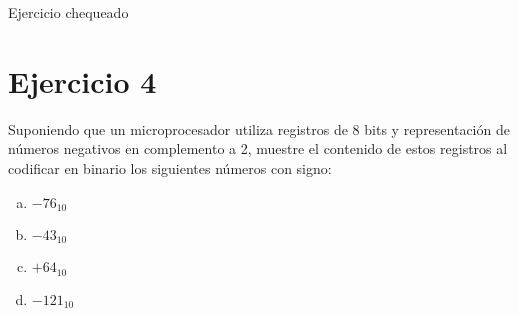 \documentclass{article}
\begin{document}
{\color{green} Ejercicio chequeado}

\section*{Ejercicio 4}
Suponiendo que un microprocesador utiliza registros de 8 bits y representación de números negativos en complemento a 2, muestre el contenido de estos registros al codificar en binario los siguientes números con signo:
\begin{enumerate}[a)]
    \item $-76_{10}$
    \item $-43_{10}$
    \item $+64_{10}$
    \item $-121_{10}$
\end{enumerate}
\end{document}
